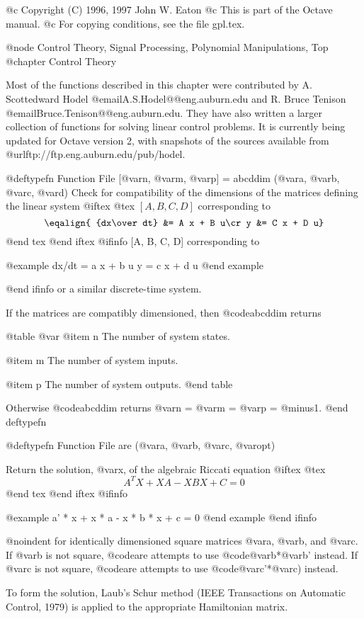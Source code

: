 @c Copyright (C) 1996, 1997 John W. Eaton
@c This is part of the Octave manual.
@c For copying conditions, see the file gpl.tex.

@node Control Theory, Signal Processing, Polynomial Manipulations, Top
@chapter Control Theory

Most of the functions described in this chapter were contributed by
A. Scottedward Hodel @email{A.S.Hodel@@eng.auburn.edu} and R. Bruce Tenison
@email{Bruce.Tenison@@eng.auburn.edu}.  They have also written a larger
collection of functions for solving linear control problems.  It is
currently being updated for Octave version 2, with snapshots of the
sources available from @url{ftp://ftp.eng.auburn.edu/pub/hodel}.

@deftypefn {Function File} {[@var{n}, @var{m}, @var{p}] =} abcddim (@var{a}, @var{b}, @var{c}, @var{d})
Check for compatibility of the dimensions of the matrices defining
the linear system
@iftex
@tex
$[A, B, C, D]$ corresponding to
$$
\eqalign{
 {dx\over dt} &= A x + B u\cr
            y &= C x + D u}
$$
@end tex
@end iftex
@ifinfo
[A, B, C, D] corresponding to

@example
dx/dt = a x + b u
y = c x + d u
@end example

@end ifinfo
or a similar discrete-time system.

If the matrices are compatibly dimensioned, then @code{abcddim} returns

@table @var
@item n
The number of system states.

@item m
The number of system inputs.

@item p
The number of system outputs.
@end table

Otherwise @code{abcddim} returns @var{n} = @var{m} = @var{p} = @minus{}1.
@end deftypefn

@deftypefn {Function File} {} are (@var{a}, @var{b}, @var{c}, @var{opt})

Return the solution, @var{x}, of the algebraic Riccati equation
@iftex
@tex
$$
A^TX + XA - XBX + C = 0
$$
@end tex
@end iftex
@ifinfo

@example
a' * x + x * a - x * b * x + c = 0
@end example
@end ifinfo

@noindent
for identically dimensioned square matrices @var{a}, @var{b}, and
@var{c}.  If @var{b} is not square, @code{are} attempts to use
@code{@var{b}*@var{b}'} instead.  If @var{c} is not square, @code{are}
attempts to use @code{@var{c}'*@var{c}}) instead.

To form the solution, Laub's Schur method (IEEE Transactions on
Automatic Control, 1979) is applied to the appropriate Hamiltonian
matrix.

